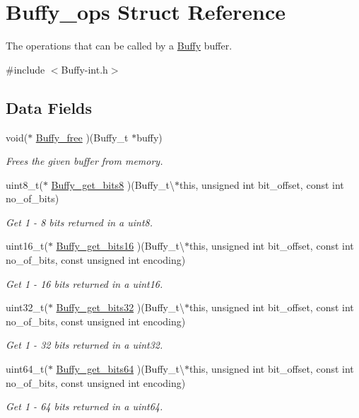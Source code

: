 \hypertarget{struct_buffy__ops}{\section{Buffy\-\_\-ops Struct Reference}
\label{struct_buffy__ops}
}


The operations that can be called by a \hyperlink{struct_buffy}{Buffy} buffer.  




{\ttfamily \#include $<$Buffy-\/int.\-h$>$}

\subsection*{Data Fields}
\begin{DoxyCompactItemize}
\item 
void($\ast$ \hyperlink{struct_buffy__ops_a1bf805e996d3880005be3da20e718b1a}{Buffy\-\_\-free} )(Buffy\-\_\-t $\ast$buffy)
\begin{DoxyCompactList}\small\item\em Frees the given buffer from memory. \end{DoxyCompactList}\item 
uint8\-\_\-t($\ast$ \hyperlink{struct_buffy__ops_a1bda227c6a32b52849c8c7e7b9eb00e4}{Buffy\-\_\-get\-\_\-bits8} )(Buffy\-\_\-t\textbackslash{}$\ast$this, unsigned int bit\-\_\-offset, const int no\-\_\-of\-\_\-bits)
\begin{DoxyCompactList}\small\item\em Get 1 -\/ 8 bits returned in a uint8. \end{DoxyCompactList}\item 
uint16\-\_\-t($\ast$ \hyperlink{struct_buffy__ops_a342ee8fffa1a034b236773573fc691c8}{Buffy\-\_\-get\-\_\-bits16} )(Buffy\-\_\-t\textbackslash{}$\ast$this, unsigned int bit\-\_\-offset, const int no\-\_\-of\-\_\-bits, const unsigned int encoding)
\begin{DoxyCompactList}\small\item\em Get 1 -\/ 16 bits returned in a uint16. \end{DoxyCompactList}\item 
uint32\-\_\-t($\ast$ \hyperlink{struct_buffy__ops_a1e222289ccf2cedf28b0d12d77f72f63}{Buffy\-\_\-get\-\_\-bits32} )(Buffy\-\_\-t\textbackslash{}$\ast$this, unsigned int bit\-\_\-offset, const int no\-\_\-of\-\_\-bits, const unsigned int encoding)
\begin{DoxyCompactList}\small\item\em Get 1 -\/ 32 bits returned in a uint32. \end{DoxyCompactList}\item 
uint64\-\_\-t($\ast$ \hyperlink{struct_buffy__ops_a7618fdc673f1de40c5718dc55fc2e6bf}{Buffy\-\_\-get\-\_\-bits64} )(Buffy\-\_\-t\textbackslash{}$\ast$this, unsigned int bit\-\_\-offset, const int no\-\_\-of\-\_\-bits, const unsigned int encoding)
\begin{DoxyCompactList}\small\item\em Get 1 -\/ 64 bits returned in a uint64. \end{DoxyCompactList}\end{DoxyCompactItemize}



